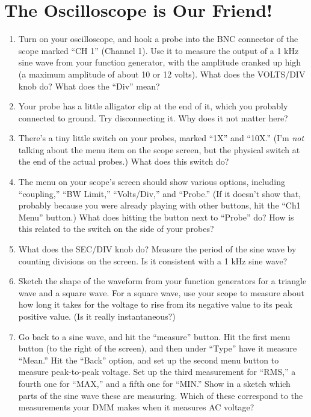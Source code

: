 \section{The Oscilloscope is Our Friend!}
\label{lab_oscilloscope}


\bigskip

\begin{enumerate}[wide]

\item Turn on your oscilloscope, and hook a probe into the BNC connector of the scope marked ``CH 1'' (Channel 1).  Use it to measure the output of a 1 kHz sine wave from your function generator, with the amplitude cranked up high (a maximum amplitude of about 10 or 12 volts).  What does the VOLTS/DIV knob do?  What does the ``Div'' mean?

\item Your probe has a little alligator clip at the end of it, which you probably connected to ground.  Try disconnecting it.  Why does it not matter here?

\item There's a tiny little switch on your probes, marked ``1X'' and ``10X.'' (I'm \emph{not} talking about the menu item on the scope screen, but the physical switch at the end of the actual probes.)  What does this switch do?

\item The menu on your scope's screen should show various options, including ``coupling,'' ``BW Limit,'' ``Volts/Div,'' and ``Probe.''  (If it doesn't show that, probably because you were already playing with other buttons, hit the ``Ch1 Menu'' button.)  What does hitting the button next to ``Probe'' do?  How is this related to the switch on the side of your probes?

\item What does the SEC/DIV knob do?  Measure the period of the sine wave by counting divisions on the screen.  Is it consistent with a 1 kHz sine wave?

\item Sketch the shape of the waveform from your function generators for a triangle wave and a square wave.  For a square wave, use your scope to measure about how long it takes for the voltage to rise from its negative value to its peak positive value.  (Is it really instantaneous?)

\item Go back to a sine wave, and hit the ``measure'' button.  Hit the first menu button (to the right of the screen), and then under ``Type'' have it measure ``Mean.''  Hit the ``Back'' option, and set up the second menu button to measure peak-to-peak voltage.  Set up the third measurement for ``RMS,'' a fourth one for ``MAX,'' and a fifth one for ``MIN.'' Show in a sketch which parts of the sine wave these are measuring.  Which of these correspond to the measurements your DMM makes when it measures AC voltage?


\end{enumerate}
